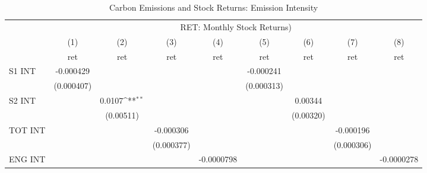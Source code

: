 \begin{table}[htbp]\centering
\def\sym#1{\ifmmode^{#1}\else\(^{#1}\)\fi}
\caption{Carbon Emissions and Stock Returns: Emission Intensity}
\begin{tabular}{l*{8}{c}}
\hline\hline
                    &\multicolumn{8}{c}{RET: Monthly Stock Returns) }                                                                                                                               \\\cmidrule(lr){2-9}
                    &\multicolumn{1}{c}{(1)}&\multicolumn{1}{c}{(2)}&\multicolumn{1}{c}{(3)}&\multicolumn{1}{c}{(4)}&\multicolumn{1}{c}{(5)}&\multicolumn{1}{c}{(6)}&\multicolumn{1}{c}{(7)}&\multicolumn{1}{c}{(8)}\\
                    &\multicolumn{1}{c}{ret}&\multicolumn{1}{c}{ret}&\multicolumn{1}{c}{ret}&\multicolumn{1}{c}{ret}&\multicolumn{1}{c}{ret}&\multicolumn{1}{c}{ret}&\multicolumn{1}{c}{ret}&\multicolumn{1}{c}{ret}\\
\hline
S1 INT              &   -0.000429         &                     &                     &                     &   -0.000241         &                     &                     &                     \\
                    &  (0.000407)         &                     &                     &                     &  (0.000313)         &                     &                     &                     \\
S2 INT              &                     &      0.0107\sym{**} &                     &                     &                     &     0.00344         &                     &                     \\
                    &                     &   (0.00511)         &                     &                     &                     &   (0.00320)         &                     &                     \\
TOT INT             &                     &                     &   -0.000306         &                     &                     &                     &   -0.000196         &                     \\
                    &                     &                     &  (0.000377)         &                     &                     &                     &  (0.000306)         &                     \\
ENG INT             &                     &                     &                     &  -0.0000798         &                     &                     &                     &  -0.0000278         \\

\end{tabular}
\end{table}
